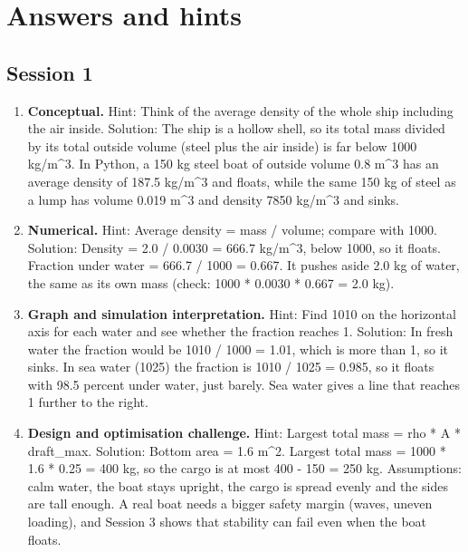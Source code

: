 \documentclass[11pt,a4paper]{article}
\begin{document}
\section{Answers and hints}

\subsection*{Session 1}
\begin{enumerate}[nosep]
\item \textbf{Conceptual.} Hint: Think of the average density of the whole ship including the air inside. Solution: The ship is a hollow shell, so its total mass divided by its total outside volume (steel plus the air inside) is far below 1000 kg/m\textasciicircum{}3. In Python, a 150 kg steel boat of outside volume 0.8 m\textasciicircum{}3 has an average density of 187.5 kg/m\textasciicircum{}3 and floats, while the same 150 kg of steel as a lump has volume 0.019 m\textasciicircum{}3 and density 7850 kg/m\textasciicircum{}3 and sinks.
\item \textbf{Numerical.} Hint: Average density = mass / volume; compare with 1000. Solution: Density = 2.0 / 0.0030 = 666.7 kg/m\textasciicircum{}3, below 1000, so it floats. Fraction under water = 666.7 / 1000 = 0.667. It pushes aside 2.0 kg of water, the same as its own mass (check: 1000 * 0.0030 * 0.667 = 2.0 kg).
\item \textbf{Graph and simulation interpretation.} Hint: Find 1010 on the horizontal axis for each water and see whether the fraction reaches 1. Solution: In fresh water the fraction would be 1010 / 1000 = 1.01, which is more than 1, so it sinks. In sea water (1025) the fraction is 1010 / 1025 = 0.985, so it floats with 98.5 percent under water, just barely. Sea water gives a line that reaches 1 further to the right.
\item \textbf{Design and optimisation challenge.} Hint: Largest total mass = rho * A * draft\_max. Solution: Bottom area = 1.6 m\textasciicircum{}2. Largest total mass = 1000 * 1.6 * 0.25 = 400 kg, so the cargo is at most 400 - 150 = 250 kg. Assumptions: calm water, the boat stays upright, the cargo is spread evenly and the sides are tall enough. A real boat needs a bigger safety margin (waves, uneven loading), and Session 3 shows that stability can fail even when the boat floats.
\end{enumerate}
\end{document}
